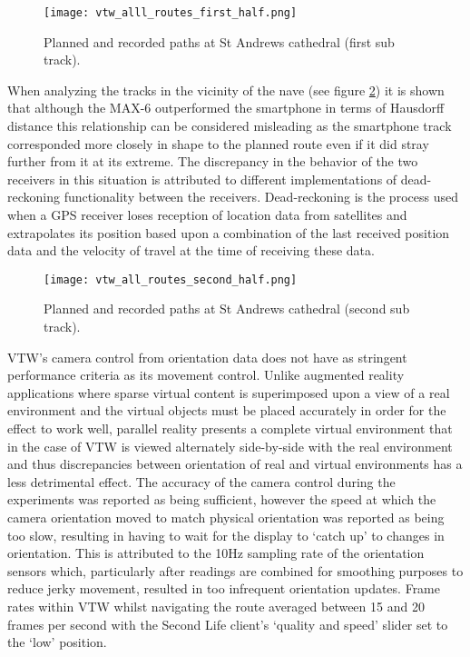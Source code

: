 \begin{figure}[h]
\centering
\texttt{[image: vtw\_alll\_routes\_first\_half.png]}
\caption{Planned and recorded paths at St Andrews cathedral (first sub track).}
\label{vtw_alll_routes_first_half.png}
\end{figure}

When analyzing the tracks in the vicinity of the nave (see figure \ref{vtw_all_routes_second_half.png}) it is shown that although the MAX-6 outperformed the smartphone in terms of Hausdorff distance this relationship can be considered misleading as the smartphone track corresponded more closely in shape to the planned route even if it did stray further from it at its extreme. The discrepancy in the behavior of the two receivers in this situation is attributed to different implementations of dead-reckoning functionality between the receivers. Dead-reckoning is the process used when a GPS receiver loses reception of location data from satellites and extrapolates its position based upon a combination of the last received position data and the velocity of travel at the time of receiving these data.
 
\begin{figure}[h]
\centering
\texttt{[image: vtw\_all\_routes\_second\_half.png]}
\caption{Planned and recorded paths at St Andrews cathedral (second sub track).}
\label{vtw_all_routes_second_half.png}
\end{figure}

VTW's camera control from orientation data does not have as stringent performance criteria as its movement control. Unlike augmented reality applications where sparse virtual content is superimposed upon a view of a real environment and the virtual objects must be placed accurately in order for the effect to work well, parallel reality presents a complete virtual environment that in the case of VTW is viewed alternately side-by-side with the real environment and thus discrepancies between orientation of real and virtual environments has a less detrimental effect. The accuracy of the camera control during the experiments was reported as being sufficient, however the speed at which the camera orientation moved to match physical orientation was reported as being too slow, resulting in having to wait for the display to `catch up' to changes in orientation. This is attributed to the 10Hz sampling rate of the orientation sensors which, particularly after readings are combined for smoothing purposes to reduce jerky movement, resulted in too infrequent orientation updates. Frame rates within VTW whilst navigating the route averaged between 15 and 20 frames per second with the Second Life client's `quality and speed' slider set to the `low' position.

